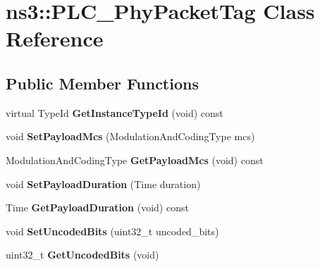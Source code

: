 \hypertarget{classns3_1_1PLC__PhyPacketTag}{\section{ns3\-:\-:\-P\-L\-C\-\_\-\-Phy\-Packet\-Tag \-Class \-Reference}
\label{classns3_1_1PLC__PhyPacketTag}
}
\subsection*{\-Public \-Member \-Functions}
\begin{DoxyCompactItemize}
\item 
\hypertarget{classns3_1_1PLC__PhyPacketTag_ae1990cc46b4be3dbf04a9b48c426f91b}{virtual \-Type\-Id {\bfseries \-Get\-Instance\-Type\-Id} (void) const }\label{classns3_1_1PLC__PhyPacketTag_ae1990cc46b4be3dbf04a9b48c426f91b}

\item 
\hypertarget{classns3_1_1PLC__PhyPacketTag_a357496cd46c7207530bd7c6939011d7c}{void {\bfseries \-Set\-Payload\-Mcs} (\-Modulation\-And\-Coding\-Type mcs)}\label{classns3_1_1PLC__PhyPacketTag_a357496cd46c7207530bd7c6939011d7c}

\item 
\hypertarget{classns3_1_1PLC__PhyPacketTag_aef30cea671ca643c742fb415c156abac}{\-Modulation\-And\-Coding\-Type {\bfseries \-Get\-Payload\-Mcs} (void) const }\label{classns3_1_1PLC__PhyPacketTag_aef30cea671ca643c742fb415c156abac}

\item 
\hypertarget{classns3_1_1PLC__PhyPacketTag_a2a6984ab4e2400bc0cf945e0f02df552}{void {\bfseries \-Set\-Payload\-Duration} (\-Time duration)}\label{classns3_1_1PLC__PhyPacketTag_a2a6984ab4e2400bc0cf945e0f02df552}

\item 
\hypertarget{classns3_1_1PLC__PhyPacketTag_a2e142fe1af78aef7e33a284adbb343e0}{\-Time {\bfseries \-Get\-Payload\-Duration} (void) const }\label{classns3_1_1PLC__PhyPacketTag_a2e142fe1af78aef7e33a284adbb343e0}

\item 
\hypertarget{classns3_1_1PLC__PhyPacketTag_af959b778ffe4548f266b00fe0f0963d8}{void {\bfseries \-Set\-Uncoded\-Bits} (uint32\-\_\-t uncoded\-\_\-bits)}\label{classns3_1_1PLC__PhyPacketTag_af959b778ffe4548f266b00fe0f0963d8}

\item 
\hypertarget{classns3_1_1PLC__PhyPacketTag_adb5c5262203f0a97e797c92cc0f759c0}{uint32\-\_\-t {\bfseries \-Get\-Uncoded\-Bits} (void)}\label{classns3_1_1PLC__PhyPacketTag_adb5c5262203f0a97e797c92cc0f759c0}


\end{DoxyCompactItemize}
